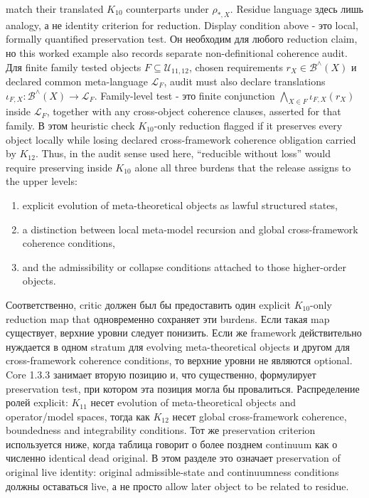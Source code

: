 match their translated \(K_{10}\) counterparts under \(\rho_{\ast,X}\).
Residue language здесь лишь analogy, а не identity criterion for reduction.
Display condition above - это local, formally quantified preservation test.
Он необходим для любого reduction claim, но this worked example also records
separate non-definitional coherence audit. Для finite family tested objects
\(F\subseteq\mathcal{U}_{11,12}\), chosen requirements \(r_X\in
\mathcal{B}^{\wedge}(X)\) и declared common meta-language \(\mathcal{L}_F\),
audit must also declare translations \(\iota_{F,X}:\mathcal{B}^{\wedge}(X)\to\mathcal{L}_F\).
Family-level test - это finite conjunction \(\bigwedge_{X\in F}\iota_{F,X}(r_X)\)
inside \(\mathcal{L}_F\), together with any cross-object coherence clauses,
asserted for that family. В этом heuristic check \(K_{10}\)-only reduction
flagged if it preserves every object locally while losing declared
cross-framework coherence obligation carried by \(K_{12}\). Thus, in the
audit sense used here, ``reducible without loss'' would require preserving
inside \(K_{10}\) alone all three burdens that the release assigns to the
upper levels:
\begin{enumerate}
\item explicit evolution of meta-theoretical objects as lawful structured
      states,
\item a distinction between local meta-model recursion and global
      cross-framework coherence conditions,
\item and the admissibility or collapse conditions attached to those
      higher-order objects.
\end{enumerate}
Соответственно, critic должен был бы предоставить один explicit
\(K_{10}\)-only reduction map that одновременно сохраняет эти burdens. Если
такая map существует, верхние уровни следует понизить. Если же framework
действительно нуждается в одном stratum для evolving meta-theoretical objects
и другом для cross-framework coherence conditions, то верхние уровни не
являются optional. Core 1.3.3 занимает вторую позицию и, что существенно,
формулирует preservation test, при котором эта позиция могла бы провалиться.
Распределение ролей explicit: \(K_{11}\) несет evolution of
meta-theoretical objects and operator/model spaces, тогда как \(K_{12}\)
несет global cross-framework coherence, boundedness and integrability
conditions. Тот же preservation criterion используется ниже, когда таблица
говорит о более позднем continuum как о численно identical dead original. В
этом разделе это означает preservation of original live identity: original
admissible-state and continuumness conditions должны оставаться live, а не
просто allow later object to be related to residue.

